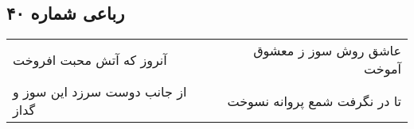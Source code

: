 \begin{center}
\section*{رباعی شماره ۴۰}
\label{sec:sh040}
\begin{longtable}{l p{0.5cm} r}
آنروز که آتش محبت افروخت
&&
عاشق روش سوز ز معشوق آموخت
\\
از جانب دوست سرزد این سوز و گداز
&&
تا در نگرفت شمع پروانه نسوخت
\\
\end{longtable}
\end{center}

